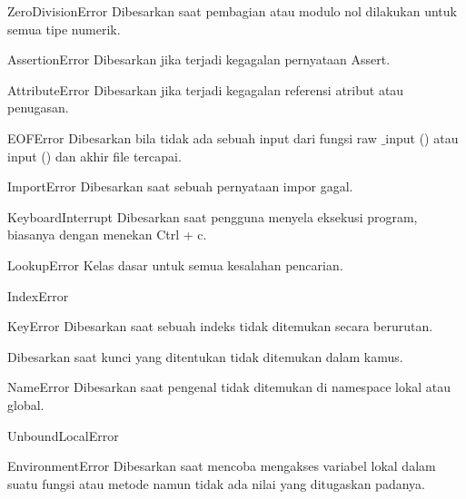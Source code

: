 \vspace{12pt}
ZeroDivisionError \hspace*{0.5in} Dibesarkan saat pembagian atau modulo nol dilakukan untuk semua tipe numerik. \par
\vspace{12pt}
AssertionError \hspace*{0.5in} Dibesarkan jika terjadi kegagalan pernyataan Assert. \par
\vspace{12pt}
AttributeError \hspace*{0.5in} Dibesarkan jika terjadi kegagalan referensi atribut atau penugasan. \par
\vspace{12pt}
EOFError \hspace*{0.5in} Dibesarkan bila tidak ada sebuah input dari fungsi raw $  \_  $input () atau input () dan akhir file tercapai. \par
\vspace{12pt}
ImportError \hspace*{0.5in} Dibesarkan saat sebuah pernyataan impor gagal. \par
\vspace{12pt}
KeyboardInterrupt \hspace*{0.5in} Dibesarkan saat pengguna menyela eksekusi program, biasanya dengan menekan Ctrl + c. \par
\vspace{12pt}
LookupError \hspace*{0.5in} Kelas dasar untuk semua kesalahan pencarian. \par
\vspace{12pt}
IndexError \par
KeyError \hspace*{0.5in} Dibesarkan saat sebuah indeks tidak ditemukan secara berurutan. \par
Dibesarkan saat kunci yang ditentukan tidak ditemukan dalam kamus. \par
\vspace{12pt}
NameError \hspace*{0.5in} Dibesarkan saat pengenal tidak ditemukan di namespace lokal atau global. \par
\vspace{12pt}
UnboundLocalError \par
EnvironmentError \hspace*{0.5in} Dibesarkan saat mencoba mengakses variabel lokal dalam suatu fungsi atau metode namun tidak ada nilai yang ditugaskan padanya. \par
